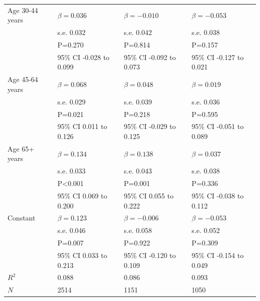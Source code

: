 \begin{table}[H]
\begin{tabular}{llll}
Age 30-44 years & $\beta=0.036$ & $\beta=-0.010$ & $\beta=-0.053$ \\ 
 & s.e. 0.032 & s.e. 0.042 & s.e. 0.038 \\ 
 & P=0.270 & P=0.814 & P=0.157 \\ 
 & 95\% CI -0.028 to 0.099 & 95\% CI -0.092 to 0.073 & 95\% CI -0.127 to 0.021 \\ 
\rowcolor[gray]{0.93}
Age 45-64 years & $\beta=0.068$ & $\beta=0.048$ & $\beta=0.019$ \\ 
\rowcolor[gray]{0.93}
 & s.e. 0.029 & s.e. 0.039 & s.e. 0.036 \\ 
\rowcolor[gray]{0.93}
 & P=0.021 & P=0.218 & P=0.595 \\ 
\rowcolor[gray]{0.93}
 & 95\% CI 0.011 to 0.126 & 95\% CI -0.029 to 0.125 & 95\% CI -0.051 to 0.089 \\ 
Age 65+ years & $\beta=0.134$ & $\beta=0.138$ & $\beta=0.037$ \\ 
 & s.e. 0.033 & s.e. 0.043 & s.e. 0.038 \\ 
 & P<0.001 & P=0.001 & P=0.336 \\ 
 & 95\% CI 0.069 to 0.200 & 95\% CI 0.055 to 0.222 & 95\% CI -0.038 to 0.112 \\ 
\rowcolor[gray]{0.93}
Constant & $\beta=0.123$ & $\beta=-0.006$ & $\beta=-0.053$ \\ 
\rowcolor[gray]{0.93}
 & s.e. 0.046 & s.e. 0.058 & s.e. 0.052 \\ 
\rowcolor[gray]{0.93}
 & P=0.007 & P=0.922 & P=0.309 \\ 
\rowcolor[gray]{0.93}
 & 95\% CI 0.033 to 0.213 & 95\% CI -0.120 to 0.109 & 95\% CI -0.154 to 0.049 \\ 
\hline
$R^2$ & 0.088 & 0.086 & 0.093 \\ 
$N$ & 2514 & 1151 & 1050 \\ 
\hline
\end{tabular}
\end{table}
